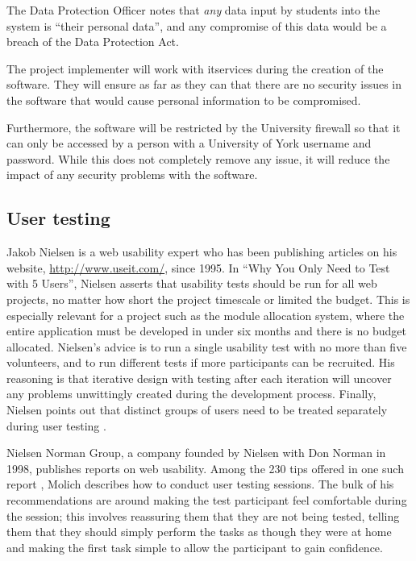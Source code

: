\documentclass[draft]{scrartcl}
\begin{document}

The Data Protection Officer notes that \emph{any} data input by students into the
system is ``their personal data'', and any compromise of this data would be a
breach of the Data Protection Act.

The project implementer will work with \gls{itservices} during the creation of
the software. They will ensure as far as they can that there are no security
issues in the software that would cause personal information to be compromised.

Furthermore, the software will be restricted by the University firewall so
that it can only be accessed by a person with a University of York username
and password. While this does not completely remove any issue, it will reduce
the impact of any security problems with the software.



\subsection{User testing}

Jakob Nielsen is a web usability expert who has been publishing articles on
his website, \url{http://www.useit.com/}, since 1995. In ``Why You Only Need to
Test with 5 Users'', Nielsen asserts that usability tests should be run for all
web projects, no matter how short the project timescale or limited the budget.
This is especially relevant for a project such as the module allocation
system, where the entire application must be developed in under six months and
there is no budget allocated. Nielsen's advice is to run a single usability
test with no more than five volunteers, and to run different tests if more
participants can be recruited. His reasoning is that iterative design with
testing after each iteration will uncover any problems unwittingly created
during the development process. Finally, Nielsen points out that distinct
groups of users need to be treated separately during user testing
\cite{nielsen2000fiveusers}.

Nielsen Norman Group, a company founded by Nielsen with Don Norman in 1998,
publishes reports on web usability. Among the 230 tips offered in one such
report \cite{nng2001tipsusability}, Molich describes how to conduct user
testing sessions. The bulk of his recommendations are around making the test
participant feel comfortable during the session; this involves reassuring them
that they are not being tested, telling them that they should simply perform
the tasks as though they were at home and making the first task simple to
allow the participant to gain confidence.
\end{document}
